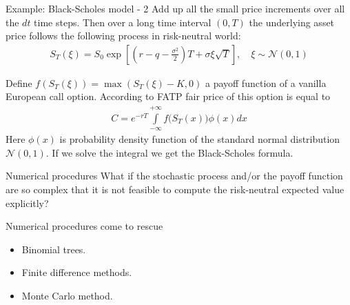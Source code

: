 \documentclass{beamer}
\begin{document}
\begin{frame}{Example: Black-Scholes model - 2}
\justify
Add up all the small price increments over all the $dt$ time steps. Then over a long time interval $(0, T)$ the underlying asset price follows the following process in risk-neutral world:
\begin{align*}
S_T(\xi) = S_0\exp{\left[\left(r - q - \frac{\sigma^2}{2}\right)T + \sigma\xi\sqrt{T}\right]}, \quad \xi \sim \mathcal{N}(0, 1)
\end{align*}

\justify
Define $f(S_T(\xi)) = \max(S_T(\xi) - K, 0)$ a payoff function of a vanilla European call option. According to FATP fair price of this option is equal to
\begin{align*}
C = e^{-rT} \int\limits_{-\infty}^{+\infty}f\Big(S_T(x)\Big)\phi(x)dx
\end{align*}
Here $\phi(x)$ is probability density function of the standard normal distribution $\mathcal{N}(0,1)$. If we solve the integral we get the Black-Scholes formula.
\end{frame}



\begin{frame}{Numerical procedures}
\justify
What if the stochastic process and/or the payoff function are so complex that it is not feasible to compute the risk-neutral expected value explicitly?

\justify
Numerical procedures come to rescue
\begin{itemize}
\item Binomial trees.
\item Finite difference methods.
\item Monte Carlo method.
\end{itemize}
\end{frame}
\end{document}
